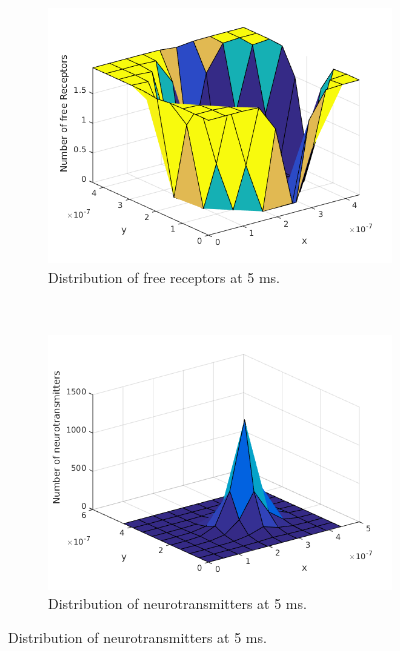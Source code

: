 \begin{figure}[ht]
    \centering
    \begin{subfigure}[b]{0.45\textwidth}
        \includegraphics[width=\textwidth]{receptordensity5ms}
        \caption{Distribution of free receptors at 5 ms.}
    \end{subfigure}
    ~ 
    \begin{subfigure}[b]{0.45\textwidth}
        \includegraphics[width=\textwidth]{distneurottansmitters5ms}
        \caption{Distribution of neurotransmitters at 5 ms.}
    \end{subfigure}


\end{figure}
